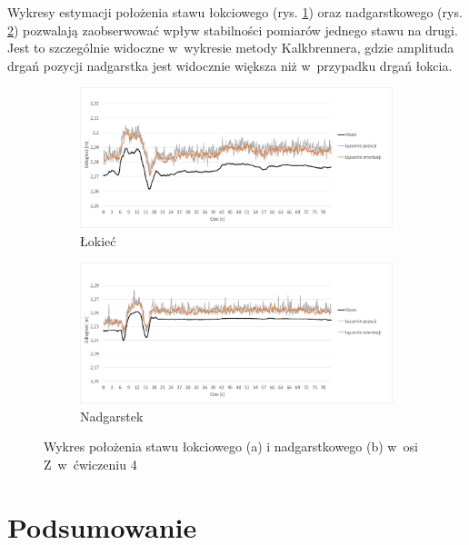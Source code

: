 Wykresy estymacji położenia stawu łokciowego (rys. \ref{fig:experiments:four:elbowZ}) oraz nadgarstkowego (rys. \ref{fig:experiments:four:wristZ}) pozwalają zaobserwować wpływ stabilności pomiarów jednego stawu na drugi. Jest to szczególnie widoczne w~wykresie metody Kalkbrennera, gdzie amplituda drgań pozycji nadgarstka jest widocznie większa niż w~przypadku drgań łokcia. 

\begin{figure}[!htb]
	\centering
	\begin{subfigure}[b]{0.65\textwidth}
		\centering
		\includegraphics[width=\linewidth]{images/400/3.png}		
		\caption{Łokieć}
		\label{fig:experiments:four:elbowZ}
	\end{subfigure}
	\begin{subfigure}[b]{0.65\textwidth}
		\centering
		\includegraphics[width=\linewidth]{images/400/6.png}		
		\caption{Nadgarstek}
		\label{fig:experiments:four:wristZ}
	\end{subfigure}
	\caption{Wykres położenia stawu łokciowego (a) i nadgarstkowego (b) w~osi Z~w~ćwiczeniu 4}	
	\label{fig:experiments:four:Zaxis}
\end{figure}

\section{Podsumowanie}


